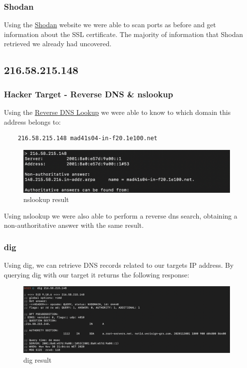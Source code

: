 \subsubsection{Shodan}

Using the \href{https://www.shodan.io/host/137.74.187.100}{Shodan} website we were able to scan ports as before and get information about the SSL certificate. The majority of information that Shodan retrieved we already had uncovered.
    

\subsection{216.58.215.148}

\subsubsection{Hacker Target - Reverse DNS \& nslookup}

Using the \href{https://hackertarget.com/reverse-dns-lookup/}{Reverse DNS Lookup} we were able to know to which domain this address belongs to: 

\begin{lstlisting}
    216.58.215.148 mad41s04-in-f20.1e100.net
\end{lstlisting}

\begin{figure}[ht!]
 	\centering
 	\includegraphics[width=1\linewidth]{img/nsl2.png}
 	\caption{nslookup result}
\end{figure}

Using nslookup we were also able to perform a reverse dns search, obtaining a non-authoritative answer with the same result.

\subsubsection{dig}

Using dig, we can retrieve DNS records related to our targets IP address. By querying dig with our target it returns the following response:

\begin{figure}[ht!]
 	\centering
 	\includegraphics[width=1\linewidth]{img/dig2.png}
 	\caption{dig result}
 \end{figure}

